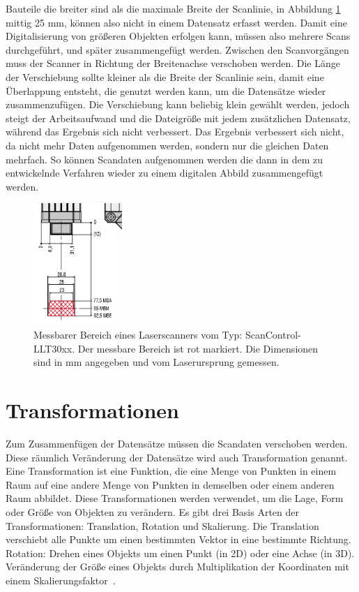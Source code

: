 Bauteile die breiter sind als die maximale Breite der Scanlinie, in Abbildung 
\ref{fig:scanner} mittig 25 mm, können also nicht in einem Datensatz erfasst werden. 
Damit eine Digitalisierung von größeren Objekten erfolgen kann, müssen
also mehrere Scans durchgeführt, und später zusammengefügt werden. Zwischen den 
Scanvorgängen muss der Scanner in Richtung der Breitenachse verschoben werden.
Die Länge der Verschiebung sollte kleiner als die Breite der Scanlinie sein, 
damit eine Überlappung entsteht, die 
genutzt werden kann, um die Datensätze wieder zusammenzufügen. Die Verschiebung kann 
beliebig klein gewählt werden, jedoch steigt der Arbeitsaufwand und die Dateigröße mit 
jedem zusätzlichen Datensatz, während das Ergebnis sich nicht verbessert.
Das Ergebnis verbessert sich nicht, da nicht mehr Daten aufgenommen werden, sondern nur 
die gleichen Daten mehrfach.
So können Scandaten aufgenommen werden die dann in dem zu entwickelnde Verfahren
wieder zu einem digitalen Abbild zusammengefügt werden.

\begin{figure}[h]
    \centering
    \includegraphics[width=0.3\textwidth]{images/Scanner.PNG}
    \caption{Messbarer Bereich eines Laserscanners vom Typ: ScanControl-LLT30xx.
    Der messbare Bereich ist rot markiert. Die Dimensionen sind in mm angegeben 
    und vom Laserursprung gemessen.}
    \label{fig:scanner}
\end{figure}

\section{Transformationen} \label{Transformation}

Zum Zusammenfügen der Datensätze müssen die Scandaten verschoben werden. 
Diese räumlich Veränderung der Datensätze wird auch Transformation genannt.
Eine Transformation ist eine Funktion, die eine Menge von Punkten in einem
Raum auf eine andere Menge von Punkten in demselben oder einem anderen Raum abbildet. 
Diese Transformationen werden verwendet, um die Lage, Form oder Größe von 
Objekten zu verändern.
Es gibt drei Basis Arten der Transformationen:
Translation, Rotation und Skalierung. Die Translation verschiebt alle Punkte 
um einen bestimmten Vektor in eine bestimmte Richtung. 
Rotation: Drehen eines Objekts um einen Punkt (in 2D) oder eine Achse (in 3D).
Veränderung der Größe eines Objekts durch Multiplikation der Koordinaten 
mit einem Skalierungsfaktor~\cite{XiaoleiDu.2009}.


